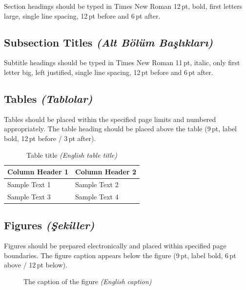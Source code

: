 \documentclass[10pt,a4paper,twocolumn]{article}
\begin{document}
Section headings should be typed in Times New Roman 12\,pt, bold,
first letters large, single line spacing, 12\,pt before and 6\,pt
after.

\subsection{Subsection Titles \normalfont\textit{(Alt Bölüm Başlıkları)}}

Subtitle headings should be typed in Times New Roman 11\,pt, italic,
only first letter big, left justified, single line spacing, 12\,pt
before and 6\,pt after.

\subsection{Tables \normalfont\textit{(Tablolar)}}

Tables should be placed within the specified page limits and numbered
appropriately. The table heading should be placed above the table
(9\,pt, label bold, 12\,pt before / 3\,pt after).

\begin{table}[htbp]
  \caption{Table title \textit{(English table title)}}
  \centering
  \fontsize{9}{11}\selectfont
  \begin{tabular}{ll}
    \toprule
    Column Header 1 & Column Header 2 \\
    \midrule
    Sample Text 1   & Sample Text 2   \\
    Sample Text 3   & Sample Text 4   \\
    \bottomrule
  \end{tabular}
\end{table}

\subsection{Figures \normalfont\textit{(Şekiller)}}

Figures should be prepared electronically and placed within specified
page boundaries. The figure caption appears below the figure (9\,pt,
label bold, 6\,pt above / 12\,pt below).

\begin{figure}[htbp]
  \centering
  \fbox{\rule{0pt}{2cm}\rule{0.8\linewidth}{0pt}} %
  \caption{The caption of the figure \textit{(English caption)}}
\end{figure}
\end{document}
